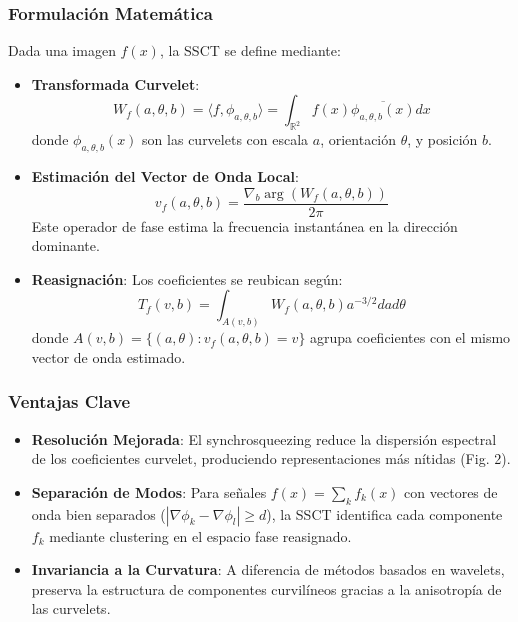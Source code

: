 \subsubsection{Formulación Matemática}

Dada una imagen \(f(x)\), la SSCT se define mediante:
\begin{itemize}
    \item \textbf{Transformada Curvelet}: 
    \[
    W_f(a, \theta, b) = \langle f, \phi_{a,\theta,b} \rangle = \int_{\mathbb{R}^2} f(x) \overline{\phi_{a,\theta,b}(x)} dx
    \]
    donde \(\phi_{a,\theta,b}(x)\) son las curvelets con escala \(a\), orientación \(\theta\), y posición \(b\).
    
    \item \textbf{Estimación del Vector de Onda Local}:
    \[
    v_f(a, \theta, b) = \frac{\nabla_b \arg(W_f(a, \theta, b))}{2\pi}
    \]
    Este operador de fase estima la frecuencia instantánea en la dirección dominante.
    
    \item \textbf{Reasignación}:
    Los coeficientes se reubican según:
    \[
    T_f(v, b) = \int_{A(v, b)} W_f(a, \theta, b) a^{-3/2} da d\theta
    \]
    donde \(A(v, b) = \{(a, \theta): v_f(a, \theta, b) = v\}\) agrupa coeficientes con el mismo vector de onda estimado\cite{SynchrosqueezedCurveletTransform}.
\end{itemize}

\subsubsection{Ventajas Clave}

\begin{itemize}
    \item \textbf{Resolución Mejorada}: El synchrosqueezing reduce la dispersión espectral de los coeficientes curvelet, produciendo representaciones más nítidas (Fig. 2).
    \item \textbf{Separación de Modos}: Para señales \(f(x) = \sum_k f_k(x)\) con vectores de onda bien separados (\(|\nabla \phi_k - \nabla \phi_l| \geq d\)), la SSCT identifica cada componente \(f_k\) mediante clustering en el espacio fase reasignado.
    \item \textbf{Invariancia a la Curvatura}: A diferencia de métodos basados en wavelets, preserva la estructura de componentes curvilíneos gracias a la anisotropía de las curvelets.
\end{itemize}

